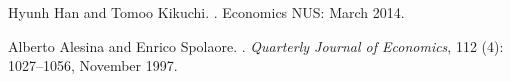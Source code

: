 \documentclass[%
 11pt%
]{article}
\begin{document}
Hyunh Han and Tomoo Kikuchi.
.
\newblock Economics NUS:  March 2014.
\medskip

Alberto Alesina and Enrico Spolaore.
.
\newblock \emph{Quarterly Journal of Economics}, 112 (4):
  1027--1056, November 1997.
\medskip

\newpage



\end{document}
